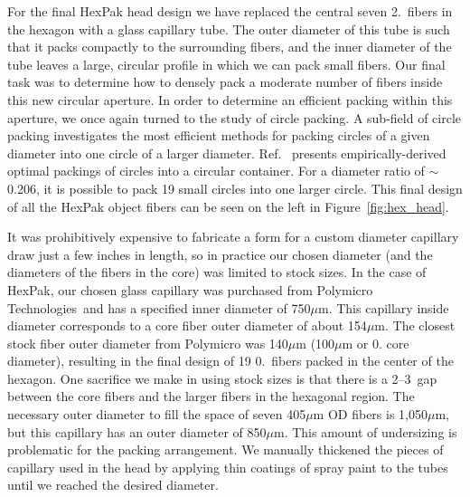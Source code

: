 For the final HexPak head design we have replaced the central seven
2.\ fibers in the hexagon with a glass capillary tube.  The outer
diameter of this tube is such that it packs compactly to the surrounding
fibers, and the inner diameter of the tube leaves a large, circular profile in
which we can pack small fibers.  Our final task was to determine how to
densely pack a moderate number of fibers inside this new circular aperture.
In order to determine an efficient packing within this aperture, we once again
turned to the study of circle packing.  A sub-field of circle packing
investigates the most efficient methods for packing circles of a given
diameter into one circle of a larger diameter.  Ref.~
presents empirically-derived optimal packings of circles into a circular
container.  For a diameter ratio of $\sim$0.206, it is possible to pack 19
small circles into one larger circle.  This final design of all the HexPak
object fibers can be seen on the left in Figure~\ref{fig:hex_head}.


It was prohibitively expensive to fabricate a form for a custom diameter
capillary draw just a few inches in length, so in practice our chosen diameter
(and the diameters of the fibers in the core) was limited to stock sizes.  In
the case of HexPak, our chosen glass capillary was purchased from Polymicro
Technologies\footnotemark\ and has a specified inner diameter of 750$\mu$m.
 This capillary inside diameter corresponds to
a core fiber outer diameter of about 154$\mu$m.  The closest stock fiber outer
diameter from Polymicro was 140$\mu$m (100$\mu$m or 0. core diameter),
resulting in the final design of 19 0.\ fibers packed in the center of
the hexagon.  One sacrifice we make in using stock sizes is that there is a
2--3\arcsec\ gap between the core fibers and the larger fibers in the
hexagonal region.  The necessary outer diameter to fill the space of seven
405$\mu$m OD fibers is 1,050$\mu$m, but this capillary has an outer diameter
of 850$\mu$m.  This amount of undersizing is problematic for the packing
arrangement.  We manually thickened the pieces of capillary used in the head
by applying thin coatings of spray paint to the tubes until we reached the
desired diameter.


